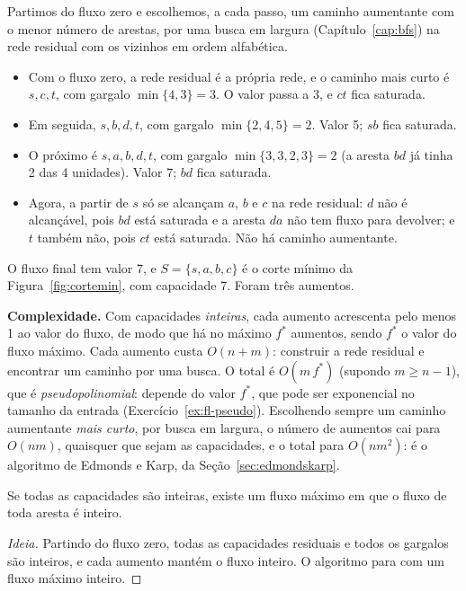 \begin{exemplo}\label{ex:ff}
Partimos do fluxo zero e escolhemos, a cada passo, um caminho aumentante com o menor número de arestas, por uma busca em largura (Capítulo~\ref{cap:bfs}) na rede residual com os vizinhos em ordem alfabética.
\begin{itemize}
  \item Com o fluxo zero, a rede residual é a própria rede, e o caminho mais curto é $s,c,t$, com gargalo $\min\{4,3\}=3$. O valor passa a 3, e $ct$ fica saturada.
  \item Em seguida, $s,b,d,t$, com gargalo $\min\{2,4,5\}=2$. Valor 5; $sb$ fica saturada.
  \item O próximo é $s,a,b,d,t$, com gargalo $\min\{3,3,2,3\}=2$ (a aresta $bd$ já tinha 2 das 4 unidades). Valor 7; $bd$ fica saturada.
  \item Agora, a partir de $s$ só se alcançam $a$, $b$ e $c$ na rede residual: $d$ não é alcançável, pois $bd$ está saturada e a aresta $da$ não tem fluxo para devolver; e $t$ também não, pois $ct$ está saturada. Não há caminho aumentante.
\end{itemize}
O fluxo final tem valor 7, e $S=\{s,a,b,c\}$ é o corte mínimo da Figura~\ref{fig:cortemin}, com capacidade 7. Foram três aumentos.
\end{exemplo}

\textbf{Complexidade.} Com capacidades \emph{inteiras}, cada aumento acrescenta pelo menos 1 ao valor do fluxo, de modo que há no máximo $f^*$ aumentos, sendo $f^*$ o valor do fluxo máximo. Cada aumento custa $O(n+m)$: construir a rede residual e encontrar um caminho por uma busca. O total é $O(m\,f^*)$ (supondo $m\ge n-1$), que é \emph{pseudopolinomial}: depende do valor $f^*$, que pode ser exponencial no tamanho da entrada (Exercício~\ref{ex:fl-pseudo}). Escolhendo sempre um caminho aumentante \emph{mais curto}, por busca em largura, o número de aumentos cai para $O(nm)$, quaisquer que sejam as capacidades, e o total para $O(nm^2)$: é o algoritmo de Edmonds e Karp, da Seção~\ref{sec:edmondskarp}.

\begin{teo}[Integralidade]\label{teo:integral}
Se todas as capacidades são inteiras, existe um fluxo máximo em que o fluxo de toda aresta é inteiro.
\end{teo}
\begin{proof}[Ideia]
Partindo do fluxo zero, todas as capacidades residuais e todos os gargalos são inteiros, e cada aumento mantém o fluxo inteiro. O algoritmo para com um fluxo máximo inteiro.
\end{proof}

